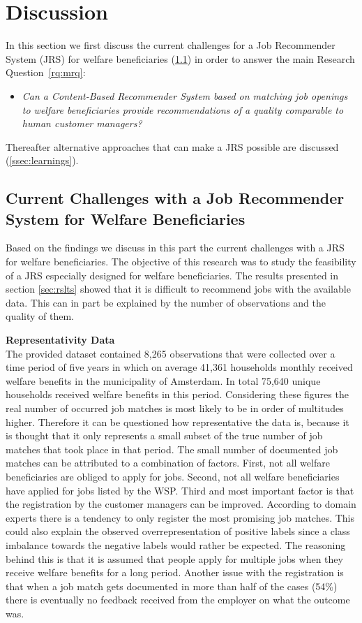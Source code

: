 \section{Discussion}
\label{sec:disc}
In this section we first discuss the current challenges for a Job Recommender System (JRS) for 
welfare beneficiaries (\ref{ssec:jrswb}) in order to answer the main Research Question~\ref{rq:mrq}: 
\begin{itemize}
	\item[] \em Can a Content-Based Recommender System based on matching job openings to welfare beneficiaries provide recommendations of a quality comparable to human customer managers?
\end{itemize}
Thereafter alternative approaches that can make a JRS possible are discussed (\ref{ssec:learnings}). 

\subsection{Current Challenges with a Job Recommender System for Welfare Beneficiaries}
\label{ssec:jrswb}
Based on the findings we discuss in this part the current challenges with a JRS for welfare beneficiaries.
The objective of this research was to study the feasibility of a JRS especially designed for welfare beneficiaries. 
The results presented in section \ref{sec:rslts} showed that it is difficult to recommend jobs with the available data.
This can in part be explained by the number of observations and the quality of them.

\noindent
\textbf{Representativity Data}\\
The provided dataset contained 8,265 observations that were collected over a time period of five years in which on average 41,361 households monthly received welfare benefits in the municipality of Amsterdam.
In total 75,640 unique households received welfare benefits in this period.
Considering these figures the real number of occurred job matches is most likely to be in order of multitudes higher.
Therefore it can be questioned how representative the data is, because it is thought that it only represents a small subset of the true number of job matches that took place in that period.  
The small number of documented job matches can be attributed to a combination of factors.
First, not all welfare beneficiaries are obliged to apply for jobs.
Second, not all welfare beneficiaries have applied for jobs listed by the WSP.
Third and most important factor is that the registration by the customer managers can be improved.
According to domain experts there is a tendency to only register the most promising job matches.
This could also explain the observed overrepresentation of positive labels since a class imbalance towards the negative labels would rather be expected.
The reasoning behind this is that it is assumed that people apply for multiple jobs when they receive welfare benefits for a long period. 
Another issue with the registration is that when a job match gets documented in more than half of the cases (54\%) there is eventually no feedback received from the employer on what the outcome was.

